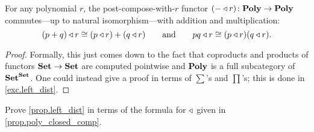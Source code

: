 \documentclass[DynamicalBook]{subfiles}
\begin{document}
\begin{proposition}\label{prop.left_dist}
For any polynomial $r$, the post-compose-with-$r$ functor $(-\mathbin{\triangleleft} r)\colon\textbf{Poly}\to\textbf{Poly}$ commutes---up to natural isomorphism---with addition and multiplication:
\[
  (p+q)\mathbin{\triangleleft} r\cong (p\mathbin{\triangleleft} r)+(q\mathbin{\triangleleft} r)
  \qquad\text{and}\qquad
  pq\mathbin{\triangleleft} r\cong (p\mathbin{\triangleleft} r)(q\mathbin{\triangleleft} r).
\]
\end{proposition} 
\begin{proof}
Formally, this just comes down to the fact that coproducts and products of functors $\textbf{Set}\to\textbf{Set}$ are computed pointwise and $\textbf{Poly}$ is a full subcategory of $\textbf{Set}^{\textbf{Set}}$. One could instead give a proof in terms of $\sum$'s and $\prod$'s; this is done in \cref{exc.left_dist}.
\end{proof}

\begin{exercise}\label{exc.left_dist}
Prove \cref{prop.left_dist} in terms of the formula for $\mathbin{\triangleleft}$ given in \cref{prop.poly_closed_comp}.
\end{exercise}
\end{document}
